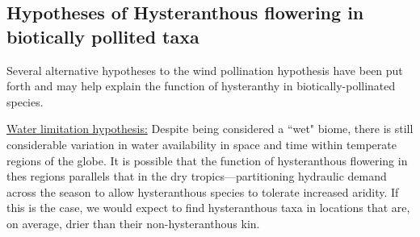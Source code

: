 \documentclass{article}[11pt]
\begin{document}

\subsection*{Hypotheses of Hysteranthous flowering in biotically pollited taxa}
Several alternative hypotheses to the wind pollination hypothesis have been put forth and may help explain the function of hysteranthy in biotically-pollinated species.  
 
\underline{Water limitation hypothesis:} Despite being considered a ``wet" biome, there is still considerable variation in water availability in space and time within temperate regions of the globe. It is possible that the function of hysteranthous flowering in thes regions parallels that in the dry tropics---partitioning hydraulic demand across the season to allow hysteranthous species to tolerate increased aridity. If this is the case, we would expect to find hysteranthous taxa in locations that are, on average, drier than their non-hysteranthous kin.

\end{document}
